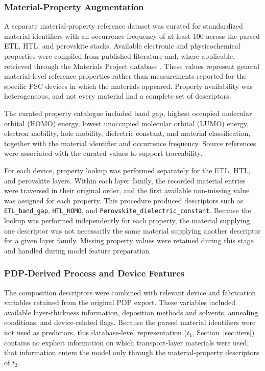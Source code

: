 \documentclass[3p]{elsarticle}
\begin{document}
\subsubsection{Material-Property Augmentation}
\label{sec:matprop}

A separate material-property reference dataset was curated for standardized material identifiers with an occurrence frequency of at least 100 across the parsed ETL, HTL, and perovskite stacks. Available electronic and physicochemical properties were compiled from published literature and, where applicable, retrieved through the Materials Project database \cite{jain2013materialsproject}. These values represent general material-level reference properties rather than measurements reported for the specific PSC devices in which the materials appeared. Property availability was heterogeneous, and not every material had a complete set of descriptors.

The curated property catalogue included band gap, highest occupied molecular orbital (HOMO) energy, lowest unoccupied molecular orbital (LUMO) energy, electron mobility, hole mobility, dielectric constant, and material classification, together with the material identifier and occurrence frequency. Source references were associated with the curated values to support traceability.

For each device, property lookup was performed separately for the ETL, HTL, and perovskite layers. Within each layer family, the recorded material entries were traversed in their original order, and the first available non-missing value was assigned for each property. This procedure produced descriptors such as \texttt{ETL\_band\_gap}, \texttt{HTL\_HOMO}, and \texttt{Perovskite\_dielectric\_constant}. Because the lookup was performed independently for each property, the material supplying one descriptor was not necessarily the same material supplying another descriptor for a given layer family. Missing property values were retained during this stage and handled during model feature preparation.

\subsubsection{PDP-Derived Process and Device Features}

The composition descriptors were combined with relevant device and fabrication variables retained from the original PDP export. These variables included available layer-thickness information, deposition methods and solvents, annealing conditions, and device-related flags. Because the parsed material identifiers were not used as predictors, this database-level representation ($t_1$, Section~\ref{sec:tiers}) contains no explicit information on which transport-layer materials were used; that information enters the model only through the material-property descriptors of $t_2$.
\end{document}
